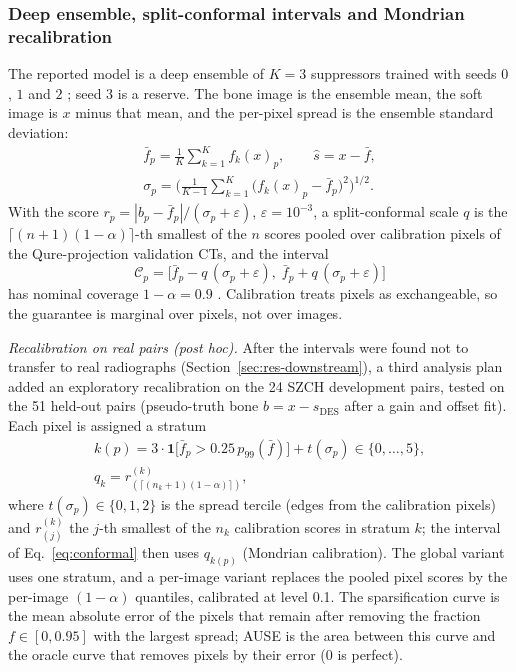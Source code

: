 \subsubsection{Deep ensemble, split-conformal intervals and Mondrian recalibration}
\label{sec:m-ensemble}
The reported model is a deep ensemble of $K=3$ suppressors trained with seeds $0$, $1$ and $2$ \cite{lakshminarayanan2017ensembles}; seed
$3$ is a reserve. The bone image is the ensemble mean, the soft image is $x$ minus that mean, and the per-pixel spread is the ensemble
standard deviation:
\begin{equation}
\begin{gathered}
\bar f_p=\frac1K\sum_{k=1}^{K}f_k(x)_p,\qquad \hat s=x-\bar f,\\
\sigma_p=\Big(\frac{1}{K-1}\sum_{k=1}^{K}\big(f_k(x)_p-\bar f_p\big)^2\Big)^{1/2}.
\end{gathered}
\label{eq:ensemble}
\end{equation}
With the score $r_p=|b_p-\bar f_p|/(\sigma_p+\varepsilon)$, $\varepsilon=10^{-3}$, a split-conformal scale $q$ is the
$\lceil (n+1)(1-\alpha)\rceil$-th smallest of the $n$ scores pooled over calibration pixels of the Qure-projection validation CTs, and the
interval
\begin{equation}
\mathcal{C}_p=\big[\bar f_p-q\,(\sigma_p+\varepsilon),\;\bar f_p+q\,(\sigma_p+\varepsilon)\big]
\label{eq:conformal}
\end{equation}
has nominal coverage $1-\alpha=0.9$ \cite{lei2018conformal,angelopoulos2023conformal}. Calibration treats pixels as exchangeable, so the
guarantee is marginal over pixels, not over images.

\emph{Recalibration on real pairs (post hoc).} After the intervals were found not to transfer to real radiographs
(Section~\ref{sec:res-downstream}), a third analysis plan added an exploratory recalibration on the 24 SZCH development pairs, tested on the
51 held-out pairs (pseudo-truth bone $b=x-s_{\mathrm{DES}}$ after a gain and offset fit). Each pixel is assigned a stratum
\begin{equation}
\begin{gathered}
k(p)=3\cdot\mathbf{1}\big[\bar f_p>0.25\,p_{99}(\bar f)\big]+t(\sigma_p)\in\{0,\dots,5\},\\
q_k=r^{(k)}_{(\lceil (n_k+1)(1-\alpha)\rceil)},
\end{gathered}
\label{eq:mondrian}
\end{equation}
where $t(\sigma_p)\in\{0,1,2\}$ is the spread tercile (edges from the calibration pixels) and $r^{(k)}_{(j)}$ the $j$-th smallest of the
$n_k$ calibration scores in stratum $k$; the interval of Eq.~\eqref{eq:conformal} then uses $q_{k(p)}$ (Mondrian calibration). The global
variant uses one stratum, and a per-image variant replaces the pooled pixel scores by the per-image $(1-\alpha)$ quantiles, calibrated at
level 0.1. The sparsification curve is the mean absolute error of the pixels that remain after removing the fraction $f\in[0,0.95]$ with
the largest spread; AUSE is the area between this curve and the oracle curve that removes pixels by their error (0 is perfect).

